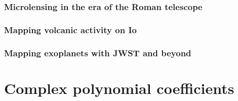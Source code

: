 \documentclass[12pt]{report}
\begin{document}
\subsection{Microlensing in the era of the Roman telescope}
\subsection{Mapping volcanic activity on Io}
\subsection{Mapping exoplanets with JWST and beyond}

\appendix

\chapter{Complex polynomial coefficients}
\label{app:complex_poly}
\end{document}
